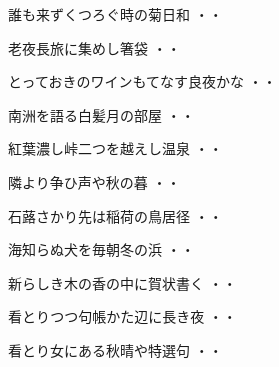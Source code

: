 \vspace{0.6cm}
\begin{shiika}誰も来ずくつろぐ時の菊日和
\hfill{・・}\end{shiika}
\vspace{0.6cm}
\begin{shiika}老夜長旅に集めし箸袋
\hfill{・・}\end{shiika}
\vspace{0.6cm}
\begin{shiika}とっておきのワインもてなす良夜かな
\hfill{・・}\end{shiika}
\vspace{0.6cm}
\begin{shiika}南洲を語る白髪月の部屋
\hfill{・・}\end{shiika}
\vspace{0.6cm}
\begin{shiika}紅葉濃し峠二つを越えし温泉
\hfill{・・}\end{shiika}
\vspace{0.6cm}
\begin{shiika}隣より争ひ声や秋の暮
\hfill{・・}\end{shiika}
\vspace{0.6cm}
\begin{shiika}石蕗さかり先は稲荷の鳥居径
\hfill{・・}\end{shiika}
\vspace{0.6cm}
\begin{shiika}海知らぬ犬を毎朝冬の浜
\hfill{・・}\end{shiika}
\vspace{0.6cm}
\begin{shiika}新らしき木の香の中に賀状書く
\hfill{・・}\end{shiika}
\vspace{0.6cm}
\begin{shiika}看とりつつ句帳かた辺に長き夜
\hfill{・・}\end{shiika}
\vspace{0.6cm}
\begin{shiika}看とり女にある秋晴や特選句
\hfill{・・}\end{shiika}
